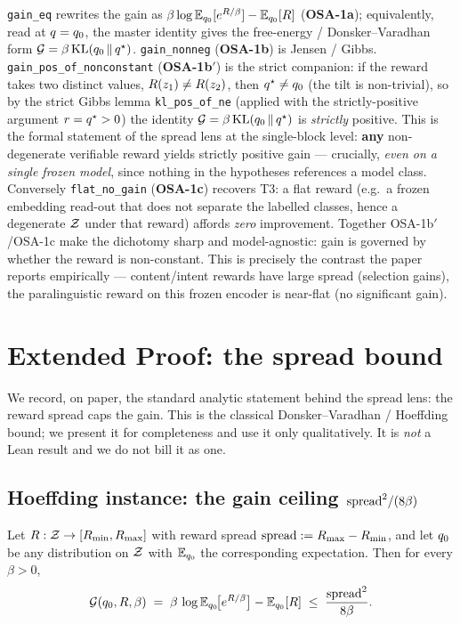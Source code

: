\noindent
\texttt{gain\_eq} rewrites the gain as $\beta\log\mathbb{E}_{q_{0}}[e^{R/\beta}]-\mathbb{E}_{q_{0}}[R]$
(\textbf{OSA-1a}); equivalently, read at $q=q_{0}$, the master identity gives the free-energy /
Donsker--Varadhan form $\mathcal{G}=\beta\,\mathrm{KL}\!\left(q_{0} \,\|\, q^{\star}\right)$. \texttt{gain\_nonneg} (\textbf{OSA-1b}) is
Jensen / Gibbs. \texttt{gain\_pos\_of\_nonconstant} (\textbf{OSA-1b}$'$) is the strict companion: if the
reward takes two distinct values, $R(z_1)\ne R(z_2)$, then $q^{\star}\ne q_{0}$ (the tilt is non-trivial),
so by the strict Gibbs lemma \texttt{kl\_pos\_of\_ne} (applied with the strictly-positive argument
$r=q^{\star}>0$) the identity $\mathcal{G}=\beta\,\mathrm{KL}\!\left(q_{0} \,\|\, q^{\star}\right)$ is \emph{strictly} positive. This is the formal
statement of the spread lens at the single-block level: \textbf{any} non-degenerate verifiable reward
yields strictly positive gain --- crucially, \emph{even on a single frozen model}, since nothing in
the hypotheses references a model class. Conversely \texttt{flat\_no\_gain} (\textbf{OSA-1c}) recovers
T3: a flat reward (e.g.\ a frozen embedding read-out that does not separate the labelled classes,
hence a degenerate $\mathcal{Z}$ under that reward) affords \emph{zero} improvement. Together OSA-1b$'$/OSA-1c
make the dichotomy sharp and model-agnostic: gain is governed by whether the reward is non-constant.
This is precisely the contrast the paper reports empirically --- content/intent rewards have large
spread (selection gains), the paralinguistic reward on this frozen encoder is near-flat (no
significant gain).

\section{Extended Proof: the spread bound}
\label{app:extended}

We record, on paper, the standard analytic statement behind the spread lens: the reward spread caps
the gain. This is the classical Donsker--Varadhan / Hoeffding bound; we present it for completeness
and use it only qualitatively. It is \emph{not} a Lean result and we do not bill it as one.

\subsection{Hoeffding instance: the gain ceiling \texorpdfstring{$\mathrm{spread}^2/(8\beta)$}{spread2/8beta}}
\label{app:hoeffding}

\begin{lemma}
\label{lem:hoeffding}
Let $R:\mathcal{Z}\to[R_{\min},R_{\max}]$ with reward spread $\mathrm{spread}:=R_{\max}-R_{\min}$, and
let $q_{0}$ be any distribution on $\mathcal{Z}$ with $\mathbb{E}_{q_{0}}$ the corresponding expectation. Then for every
$\beta>0$,
\[
\mathcal{G}(q_{0},R,\beta)\;=\;\beta\,\log\mathbb{E}_{q_{0}}\!\big[e^{R/\beta}\big]-\mathbb{E}_{q_{0}}[R]\;\le\;\frac{\mathrm{spread}^2}{8\beta}.
\]
\end{lemma}

